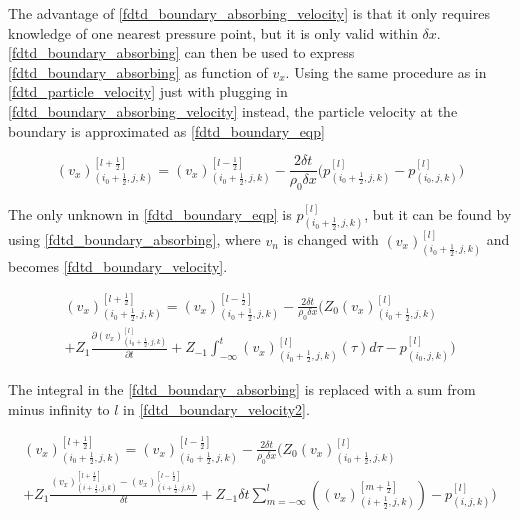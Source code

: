 The advantage of \autoref{fdtd_boundary_absorbing_velocity} is that it only requires knowledge of one nearest pressure point, but it is only valid within $\delta x$. \autoref{fdtd_boundary_absorbing} can then be used to express  \autoref{fdtd_boundary_absorbing} as function of $v_x$. Using the same procedure as in \autoref{fdtd_particle_velocity} just with plugging in \autoref{fdtd_boundary_absorbing_velocity} instead, the particle velocity at the boundary is approximated as \autoref{fdtd_boundary_eqp}

\begin{equation}\label{fdtd_boundary_eqp}
(v_x)_{(i_0+\frac{1}{2},j,k)}^{[l+\frac{1}{2}]}= (v_x)_{(i_0+\frac{1}{2},j,k)}^{[l-\frac{1}{2}]}-\frac{2 \delta t}{\rho_0 \delta x} \Biggl( 
p_{(i_0+\frac{1}{2},j,k)}^{[l]} -p_{(i_0,j,k)}^{[l]}  \Biggr)
\end{equation}

The only unknown in \autoref{fdtd_boundary_eqp} is $p_{(i_0+\frac{1}{2},j,k)}^{[l]}$, but it can be found by using \autoref{fdtd_boundary_absorbing}, where $v_n$ is changed with $(v_x)_{(i_0+\frac{1}{2},j,k)}^{[l]}$ and becomes \autoref{fdtd_boundary_velocity}.


\begin{multline}\label{fdtd_boundary_velocity}
(v_x)_{(i_0+\frac{1}{2},j,k)}^{[l+\frac{1}{2}]}= (v_x)_{(i_0+\frac{1}{2},j,k)}^{[l-\frac{1}{2}]}-\frac{2 \delta t}{\rho_0 \delta x} \Biggl( 
 Z_0(v_x)_{(i_0+\frac{1}{2},j,k)}^{[l]} \\
 +Z_1 \frac{\partial (v_x)_{(i_0+\frac{1}{2},j,k)}^{[l]}}{\partial t} +Z_{-1} \int_{-\infty}^{t} (v_x)_{(i_0+\frac{1}{2},j,k)}^{[l]}(\tau)d\tau -p_{(i_0,j,k)}^{[l]}
\Biggr)
\end{multline}

The integral in the \autoref{fdtd_boundary_absorbing} is replaced with a sum from minus infinity to $l$ in \autoref{fdtd_boundary_velocity2}.

\begin{multline}\label{fdtd_boundary_velocity2}
(v_x)_{(i_0+\frac{1}{2},j,k)}^{[l+\frac{1}{2}]}= (v_x)_{(i_0+\frac{1}{2},j,k)}^{[l-\frac{1}{2}]}-\frac{2 \delta t}{\rho_0 \delta x} \Biggl( 
 Z_0(v_x)_{(i_0+\frac{1}{2},j,k)}^{[l]} \\
+Z_1\frac{(v_x)_{(i+\frac{1}{2},j,k)}^{[l+\frac{1}{2}]}-(v_x)_{(i+\frac{1}{2},j,k)}^{[l-\frac{1}{2}]}}{\delta t}+Z_{-1} \delta t \sum_{m=-\infty}^{l} \left( (v_x)_{(i+\frac{1}{2},j,k)}^{[m+\frac{1}{2}]} \right) -p_{(i,j,k)}^{[l]}
\Biggr)
\end{multline}


